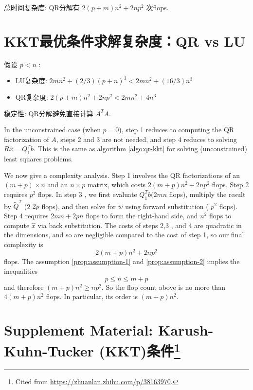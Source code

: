 总时间复杂度: QR分解有 $ 2(p+m) n^{2}+2 n p^{2} $ 次flops.


\section{KKT最优条件求解复杂度：QR vs LU}
\label{complexity:kkt}

假设 $ p<n $ :

\begin{itemize}
    \item LU复杂度: $ 2 m n^{2}+(2 / 3)(p+n)^{3}<2 m n^{2}+(16 / 3) n^{3} $
    \item QR复杂度: $ 2(p+m) n^{2}+2 n p^{2}<2 m n^{2}+4 n^{3} $
\end{itemize}

稳定性: QR分解避免直接计算 $ A^{T} {A}$.

In the unconstrained case (when $ p=0 $), step 1 reduces to computing the $ \mathrm{QR} $ factorization of $ A $, steps 2 and 3 are not needed, and step 4 reduces to solving $ R \hat{x}=Q_{1}^{T} b $. This is the same as algorithm \ref{algo:qr-kkt} for solving (unconstrained) least squares problems.

We now give a complexity analysis. Step 1 involves the QR factorizations of an $ (m+p) \times n $ and an $ n \times p $ matrix, which costs $ 2(m+p) n^{2}+2 n p^{2} $ flops. Step 2 requires $ p^{2} $ flops. In step 3 , we first evaluate $ Q_{1}^{T} b(2 m n $ flops), multiply the result by $ \tilde{Q}^{T} $ (2 $ 2 p $ flops), and then solve for $ w $ using forward substitution ( $ p^{2} $ flops). Step 4 requires $ 2 m n+2 p n $ flops to form the right-hand side, and $ n^{2} $ flops to compute $ \hat{x} $ via back substitution. The costs of steps 2,3 , and 4 are quadratic in the dimensions, and so are negligible compared to the cost of step 1, so our final complexity is
\begin{equation}
2(m+p) n^{2}+2 n p^{2}
\end{equation}
flops. The assumption \ref{prop:assumption-1} and \ref{prop:assumption-2} implies the inequalities
\begin{equation}
p \leq n \leq m+p
\end{equation}
and therefore $ (m+p) n^{2} \geq n p^{2} $. So the flop count above is no more than $ 4(m+p) n^{2} $ flops. In particular, its order is $ (m+p) n^{2} $.

\section[Supplement Material: Karush-Kuhn-Tucker (KKT)条件]{Supplement Material: Karush-Kuhn-Tucker (KKT)条件\footnote{Cited from \url{https://zhuanlan.zhihu.com/p/38163970}.}}

